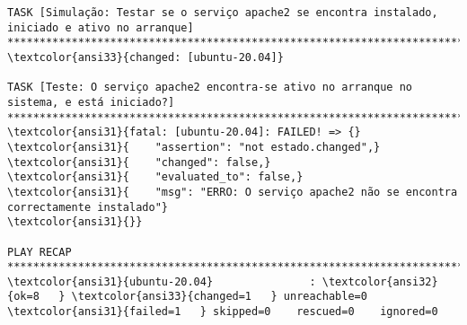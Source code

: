 \documentclass{scrartcl}
\begin{document}
\begin{Verbatim}
TASK [Simulação: Testar se o serviço apache2 se encontra instalado, iniciado e ativo no arranque] *******************************************************************************************
\textcolor{ansi33}{changed: [ubuntu-20.04]}

TASK [Teste: O serviço apache2 encontra-se ativo no arranque no sistema, e está iniciado?] **************************************************************************************************
\textcolor{ansi31}{fatal: [ubuntu-20.04]: FAILED! => {}
\textcolor{ansi31}{    "assertion": "not estado.changed",}
\textcolor{ansi31}{    "changed": false,}
\textcolor{ansi31}{    "evaluated_to": false,}
\textcolor{ansi31}{    "msg": "ERRO: O serviço apache2 não se encontra correctamente instalado"}
\textcolor{ansi31}{}}

PLAY RECAP **********************************************************************************************************************************************************************************
\textcolor{ansi31}{ubuntu-20.04}               : \textcolor{ansi32}{ok=8   } \textcolor{ansi33}{changed=1   } unreachable=0    \textcolor{ansi31}{failed=1   } skipped=0    rescued=0    ignored=0



\end{Verbatim}
\end{document}
